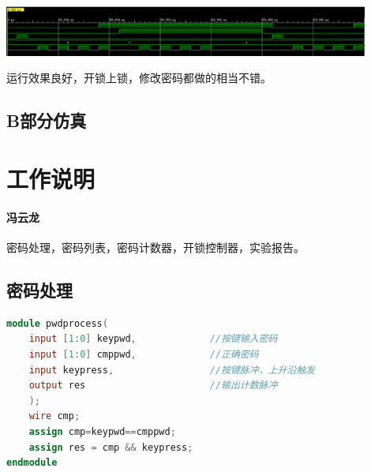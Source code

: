 \documentclass[a4paper,11pt]{ctexart}
\begin{document}
\includegraphics[width=0.9\textwidth]{./images/AlongSimOver.eps}

运行效果良好，开锁上锁，修改密码都做的相当不错。

\subsection{B部分仿真}

\section{工作说明}
\paragraph{冯云龙}密码处理，密码列表，密码计数器，开锁控制器，实验报告。
\subsection{密码处理}
\begin{lstlisting}[language={verilog}]
module pwdprocess(
    input [1:0] keypwd,             //按键输入密码
    input [1:0] cmppwd,             //正确密码
    input keypress,                 //按键脉冲，上升沿触发
    output res                      //输出计数脉冲
    );
    wire cmp;
    assign cmp=keypwd==cmppwd;
    assign res = cmp && keypress;
endmodule
\end{lstlisting}
\end{document}
